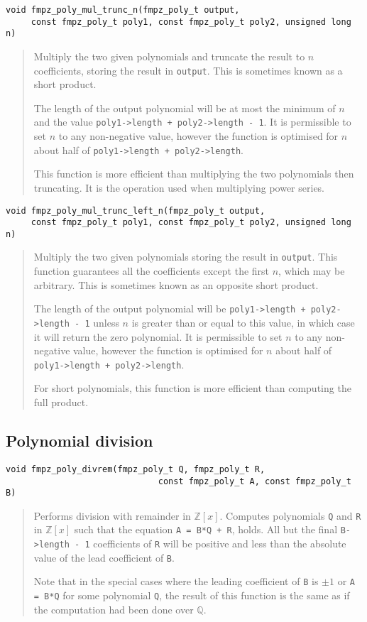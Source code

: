 \documentclass[a4paper,10pt]{article}
\newcommand{\Z}{\mathbb{Z}}
\newcommand{\Q}{\mathbb{Q}}
\newcommand{\code}{\lstinline}
\begin{document}
\begin{lstlisting}
void fmpz_poly_mul_trunc_n(fmpz_poly_t output, 
     const fmpz_poly_t poly1, const fmpz_poly_t poly2, unsigned long n) 
\end{lstlisting}
\begin{quote}
Multiply the two given polynomials and truncate the result to $n$ coefficients, storing the result in \code{output}. This is sometimes known as a short product.

The length of the output polynomial will be at most the minimum of $n$ and the value \code{poly1->length + poly2->length - 1}. It is permissible to set $n$ to any non-negative value, however the function is optimised for $n$ about half of \code{poly1->length + poly2->length}.

This function is more efficient than multiplying the two polynomials then truncating. It is the operation used when multiplying power series.
\end{quote}

\begin{lstlisting}
void fmpz_poly_mul_trunc_left_n(fmpz_poly_t output, 
     const fmpz_poly_t poly1, const fmpz_poly_t poly2, unsigned long n) 
\end{lstlisting}
\begin{quote}
Multiply the two given polynomials storing the result in \code{output}. This function guarantees all the coefficients except the first $n$, which may be arbitrary. This is sometimes known as an opposite short product.

The length of the output polynomial will be \code{poly1->length + poly2->length - 1} unless $n$ is greater than or equal to this value, in which case it will return the zero polynomial. It is permissible to set $n$ to any non-negative value, however the function is optimised for $n$ about half of \code{poly1->length + poly2->length}.

For short polynomials, this function is more efficient than computing the full product.
\end{quote}

\subsection{Polynomial division}

\begin{lstlisting}
void fmpz_poly_divrem(fmpz_poly_t Q, fmpz_poly_t R, 
                              const fmpz_poly_t A, const fmpz_poly_t B) 
\end{lstlisting}
\begin{quote}
Performs division with remainder in $\Z[x]$. Computes polynomials \code{Q} and \code{R} in $\Z[x]$ such that the equation \code{A = B*Q + R}, holds. All but the final \code{B->length - 1} coefficients of \code{R} will be positive and less than the absolute value of the lead coefficient of \code{B}.

Note that in the special cases where the leading coefficient of \code{B} is $\pm 1$ or \code{A = B*Q} for some polynomial \code{Q}, the result of this function is the same as if the computation had been done over $\Q$.
\end{quote}
\end{document}
